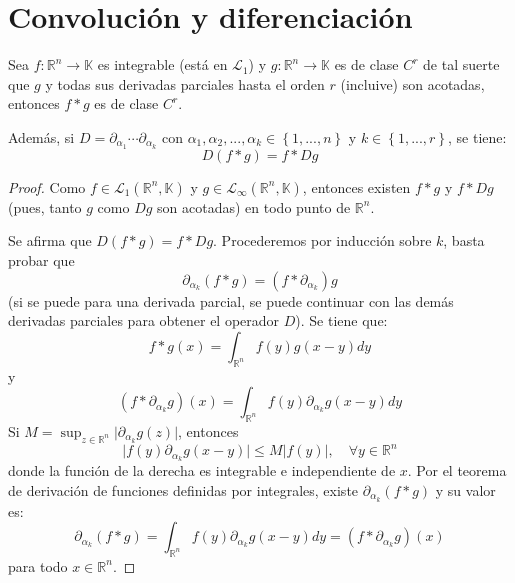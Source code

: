 \documentclass[12pt]{report}
\theoremstyle{largebreak}
\newcommand\cf[3]{\ensuremath{#1:#2\rightarrow#3}}
\newcommand\abs[1]{\ensuremath{\big|#1\big|}}
\begin{document}
    \section{Convolución y diferenciación}

    \begin{propo}
        Sea $\cf{f}{\mathbb{R}^n}{\mathbb{K}}$ es integrable (está en $\mathcal{L}_1$) y $\cf{g}{\mathbb{R}^n}{\mathbb{K}}$ es de clase $C^r$ de tal suerte que $g$ y todas sus derivadas parciales hasta el orden $r$ (incluive) son acotadas, entonces $f*g$ es de clase $C^r$.

        Además, si $D=\partial_{\alpha_1}\cdots\partial_{\alpha_k}$ con $\alpha_1,\alpha_2,...,\alpha_k\in\left\{1,...,n \right\}$ y $k\in\left\{1,...,r \right\}$, se tiene:
        \begin{equation*}
            D(f*g)=f*Dg
        \end{equation*}

    \end{propo}

    \begin{proof}
        Como $f\in\mathcal{L}_1(\mathbb{R}^n,\mathbb{K})$ y $g\in\mathcal{L}_\infty(\mathbb{R}^n,\mathbb{K})$, entonces existen $f*g$ y $f*Dg$ (pues, tanto $g$ como $Dg$ son acotadas) en todo punto de $\mathbb{R}^n$.

        Se afirma que $D(f*g)=f*Dg$. Procederemos por inducción sobre $k$, basta probar que
        \begin{equation*}
            \partial_{\alpha_k}(f*g)=(f*\partial_{\alpha_k})g
        \end{equation*}
        (si se puede para una derivada parcial, se puede continuar con las demás derivadas parciales para obtener el operador $D$). Se tiene que:
        \begin{equation*}
            f*g(x)=\int_{\mathbb{R}^n}f(y)g(x-y)dy
        \end{equation*}
        y
        \begin{equation*}
            (f*\partial_{\alpha_k}g)(x)=\int_{\mathbb{R}^n}f(y)\partial_{\alpha_k}g(x-y)dy
        \end{equation*}
        Si $M=\sup_{z\in\mathbb{R}^n}\abs{\partial_{\alpha_k}g(z)}$, entonces
        \begin{equation*}
            \abs{f(y)\partial_{\alpha_k}g(x-y)}\leq M\abs{f(y)},\quad\forall y\in\mathbb{R}^n
        \end{equation*}
        donde la función de la derecha es integrable e independiente de $x$. Por el teorema de derivación de funciones definidas por integrales, existe $\partial_{\alpha_k}(f*g)$ y su valor es:
        \begin{equation*}
            \partial_{\alpha_k}(f*g)=\int_{\mathbb{R}^n}f(y)\partial_{\alpha_k}g(x-y)dy=(f*\partial_{\alpha_k}g)(x)
        \end{equation*}
        para todo $x\in\mathbb{R}^n$.
    \end{proof}
\end{document}
